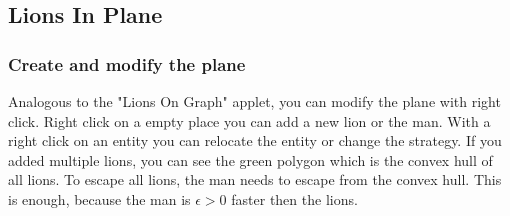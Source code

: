 \documentclass[a4paper]{article}
\begin{document}
\subsection{Lions In Plane}\label{sec:applet_plane}

\subsubsection*{Create and modify the plane}
Analogous to the "Lions On Graph" applet, you can modify the plane with right click. Right click on a empty place you can add a new lion or the man. With a right click on an entity you can relocate the entity or change the strategy. If you added multiple lions, you can see the green polygon which is the convex hull of all lions. To escape all lions, the man needs to escape from the convex hull. This is enough, because the man is $\epsilon > 0$ faster then the lions.
\end{document}
